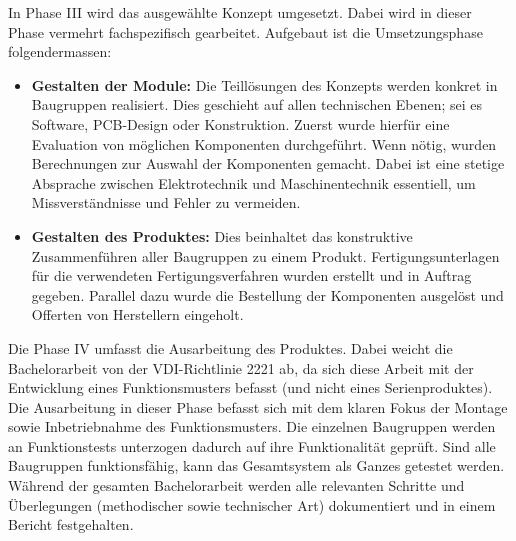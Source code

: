 In Phase III wird das ausgewählte Konzept umgesetzt. Dabei wird in dieser Phase vermehrt fachspezifisch gearbeitet. Aufgebaut ist die Umsetzungsphase folgendermassen:
\begin{itemize}
	\item \textbf{Gestalten der Module:} Die Teillösungen des Konzepts werden konkret in Baugruppen realisiert. Dies geschieht auf allen technischen Ebenen; sei es Software, PCB-Design oder Konstruktion. Zuerst wurde hierfür eine Evaluation von möglichen Komponenten durchgeführt. Wenn nötig, wurden Berechnungen zur Auswahl der Komponenten gemacht. Dabei ist eine stetige Absprache zwischen Elektrotechnik und Maschinentechnik essentiell, um Missverständnisse und Fehler zu vermeiden.
	
	\item \textbf{Gestalten des Produktes:} Dies beinhaltet das konstruktive Zusammenführen aller Baugruppen zu einem Produkt. Fertigungsunterlagen für die verwendeten Fertigungsverfahren wurden erstellt und in Auftrag gegeben. Parallel dazu wurde die Bestellung der Komponenten ausgelöst und Offerten von Herstellern eingeholt. 
\end{itemize}

Die Phase IV umfasst die Ausarbeitung des Produktes. Dabei weicht die Bachelorarbeit von der VDI-Richtlinie 2221 ab, da sich diese Arbeit mit der Entwicklung eines Funktionsmusters befasst (und nicht eines Serienproduktes). Die Ausarbeitung in dieser Phase befasst sich mit dem klaren Fokus der Montage sowie Inbetriebnahme des Funktionsmusters. Die einzelnen Baugruppen werden an Funktionstests unterzogen dadurch auf ihre Funktionalität geprüft. Sind alle Baugruppen funktionsfähig, kann das Gesamtsystem als Ganzes getestet werden.
\newline
Während der gesamten Bachelorarbeit werden alle relevanten Schritte und Überlegungen (methodischer sowie technischer Art) dokumentiert und in einem Bericht festgehalten.
